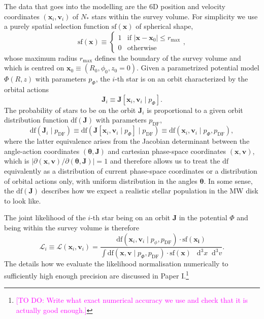\documentclass[iop,revtex4,numberedappendix,appendixfloats]{emulateapj}
\newcommand{\vect}[1]{\boldsymbol{#1}}
\newcommand*\Diff[1]{\mathop{}\!\mathrm{d^#1}}
\newcommand{\Wilma}[1]{\textcolor{Magenta}{#1}}
\begin{document}
The data that goes into the modelling are the 6D position and velocity coordinates $(\vect{x}_i,\vect{v}_i)$ of $N_*$ stars within the survey volume. For simplicity we use a purely spatial selection function $\text{sf}(\vect{x})$ of spherical shape,
\begin{equation*}
\text{sf}(\vect{x}) \equiv \begin{cases} 1 &\mbox{if } \left| \vect{x}-\vect{x}_0 \right| \leq r_\text{max} \\
0 & \mbox{otherwise} \end{cases},
\end{equation*}
whose maximum radius $r_\text{max}$ defines the boundary of the survey volume and which is centred on $\vect{x}_0 \equiv (R_0,\phi_0,z_0=0)$. Given a parametrized potential model $\Phi(R,z)$ with parameters $p_\Phi$, the $i$-th star is on an orbit characterized by the orbital actions 
\begin{equation*}
\vect{J}_i \equiv \vect{J}[\vect{x}_i,\vect{v}_i \mid p_\Phi].
\end{equation*}
The probability of stars to be on the orbit $\vect{J}_i$ is proportional to a given orbit distribution function $\text{df}(\vect{J})$ with parameters $p_\text{DF}$,
\begin{equation*}
\text{df}(\vect{J}_i \mid p_\text{DF}) \equiv \text{df}(\vect{J}[\vect{x}_i,\vect{v}_i \mid p_\Phi] \mid p_\text{DF}) \equiv \text{df}(\vect{x}_i,\vect{v}_i \mid p_\Phi,p_\text{DF}),
\end{equation*} 
where the latter equivalence arises from the Jacobian determinant between the angle-action coordinates $(\vect{\theta},\vect{J})$ and cartesian phase-space coordinates $(\vect{x},\vect{v})$, which is $\left| \partial (\vect{x},\vect{v}) / \partial(\vect{\theta},\vect{J})\right|=1$ and therefore allows us to treat the $\text{df}$ equivalently as a distribution of current phase-space coordinates or a distribution of orbital actions only, with uniform distribution in the angles $\vect{\theta}$. In some sense, the $\text{df}(\vect{J})$ describes how we expect a realistic stellar population in the MW disk to look like.

The joint likelihood of the $i$-th star being on an orbit $\vect{J}$ in the potential $\Phi$ and being within the survey volume is therefore
\begin{equation*}
\mathscr{L}_i \equiv \mathscr{L}(\vect{x}_i,\vect{v}_i) = \frac{\text{df}(\vect{x}_i,\vect{v}_i\mid p_\phi, p_\text{DF}) \cdot \text{sf}(\vect{x_i})}{\int \text{df}(\vect{x},\vect{v}\mid p_\Phi, p_\text{DF}) \cdot \text{sf}(\vect{x}) \ \Diff3 x \Diff3 v}.
\end{equation*}
The details how we evaluate the likelihood normalisation numerically to sufficiently high enough precision are discussed in Paper I.\footnote{\Wilma{[TO DO: Write what exact numerical accuracy we use and check that it is actually good enough.]}}
\end{document}
